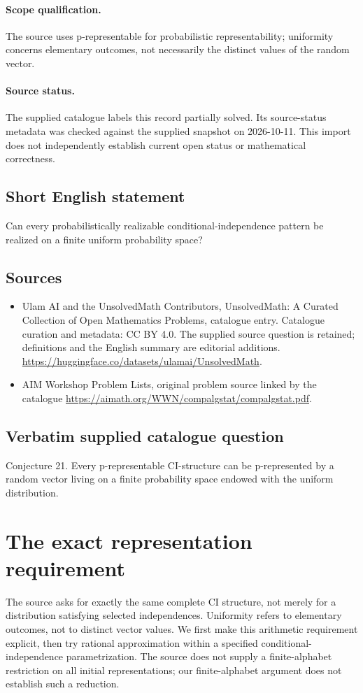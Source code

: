 \documentclass[11pt]{article}
\begin{document}
\paragraph{Scope qualification.}
The source uses p-representable for probabilistic representability; uniformity concerns elementary outcomes, not necessarily the distinct values of the random vector.
\paragraph{Source status.}
The supplied catalogue labels this record partially solved. Its source-status metadata was checked against the supplied snapshot on 2026-10-11. This import does not independently establish current open status or mathematical correctness.
\subsection{Short English statement}
Can every probabilistically realizable conditional-independence pattern be realized on a finite uniform probability space?
\subsection{Sources}
\begin{itemize}
\item[S1] Ulam AI and the UnsolvedMath Contributors, UnsolvedMath: A Curated Collection of Open Mathematics Problems, catalogue entry. Catalogue curation and metadata: CC BY 4.0. The supplied source question is retained; definitions and the English summary are editorial additions.
\url{https://huggingface.co/datasets/ulamai/UnsolvedMath}.
\item[S2] AIM Workshop Problem Lists, original problem source linked by the catalogue
\url{https://aimath.org/WWN/compalgstat/compalgstat.pdf}.
\end{itemize}
\subsection{Verbatim supplied catalogue question}
Conjecture 21. Every p-representable CI-structure can be p-represented by a random vector living on a finite probability space endowed with the uniform distribution.

\section{The exact representation requirement}
The source asks for exactly the same complete CI structure, not merely
for a distribution satisfying selected independences. Uniformity refers
to elementary outcomes, not to distinct vector values. We first make this
arithmetic requirement explicit, then try rational approximation within
a specified conditional-independence parametrization. The source does
not supply a finite-alphabet restriction on all initial representations;
our finite-alphabet argument does not establish such a reduction.
\end{document}
